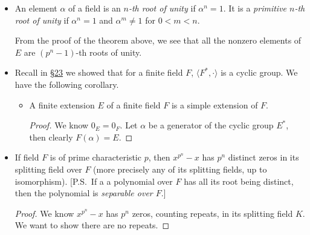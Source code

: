 \documentclass[11pt]{article}
\newcommand{\lk}[2]{\hyperlink{subsection.#1.#2}{\S#2}} %
\newcommand{\Z}{\mathbf{Z}}
\newcommand{\df}[1]{\textit{\textsf{#1}}}
\newcommand{\la}{\langle}
\newcommand{\ra}{\rangle}
\newcommand{\clos}[1]{\overline{#1}}
\begin{document}
\begin{itemize}
    Furthermore, for field $E$ of $p^n$ elements contained in a splitting field $K$ of $x^{p^n}-x$ over $\Z_p$, the elements of $E$ are precisely the zeros of the polynomial $x^{p^n}-x \in \Z_p[x]$ in this splitting field $K$. (\emph{The two results will be very important at the end of the section!})
    
    \begin{proof}
        We know $\la E^*,\cdot \ra$ is a group of order $p^n - 1$. For any $\alpha \in E^*$, the order of $\alpha$ divides $p^n-1$. Therefore, $\alpha^{p^n-1} = 1$, which implies that $\alpha^{p^n} = \alpha$. Every element of $E$ is now a zero to $x^{p^n} - x$ in some splitting field $K$ of $x^{p^n} - x$ (created by adjoining all the elements of $E$ to $\Z_p$). Since $x^{p^n} - x$ can have at most $p^n$ distinct zeros in $K$, all the elements of $E$ must be exactly all the zeros in $K$ of $x^{p^n} - x$.
    \end{proof}
    \item An element $\alpha$ of a field is an \df{$n$-th root of unity} if $\alpha^n = 1$. It is a \df{primitive $n$-th root of unity} if $\alpha^n = 1$ and $\alpha^m \neq 1$ for $0 < m < n$.
    
    From the proof of the theorem above, we see that all the nonzero elements of $E$ are $(p^n-1)$-th roots of unity.
    \item Recall in \lk{4}{23} we showed that for a finite field $F$, $\la F^*,\cdot \ra$ is a cyclic group. We have the following corollary.
    \begin{itemize}
        \item A finite extension $E$ of a finite field $F$ is a simple extension of $F$.
        \begin{proof} We know $0_E = 0_F$. Let $\alpha$ be a generator of the cyclic group $E^*$, then clearly $F(\alpha) = E$.
        \end{proof}
    \end{itemize}
    \item If field $F$ is of prime characteristic $p$, then $x^{p^n} - x$ has $p^n$ distinct zeros in its splitting field over $F$ (more precisely any of its splitting fields, up to isomorphism). [P.S.\ If a a polynomial over $F$ has all its root being distinct, then the polynomial is \df{separable over $F$}.]
    \begin{proof}
        We know $x^{p^n}-x$ has $p^n$ zeros, counting repeats, in its splitting field $K$. We want to show there are no repeats.
        

\end{proof}
\end{itemize}
\end{document}
